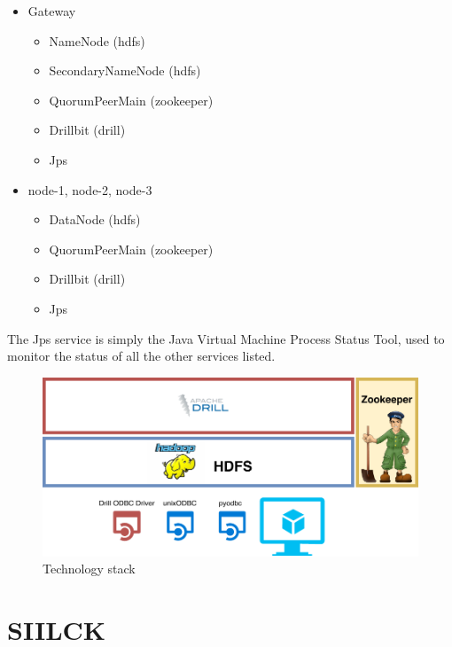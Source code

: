 \documentclass[a4paper,english]{report}
\begin{document}
			\begin{itemize}
				\item Gateway
				\begin{itemize}
					\item NameNode (hdfs)
					\item SecondaryNameNode (hdfs)
					\item QuorumPeerMain (zookeeper)
					\item Drillbit (drill)
					\item Jps
				\end{itemize}
				\item node-1, node-2, node-3
				\begin{itemize}
					\item DataNode (hdfs)
					\item QuorumPeerMain (zookeeper)
					\item Drillbit (drill)
					\item Jps
				\end{itemize}
			\end{itemize}
			The Jps service is simply the Java Virtual Machine Process Status Tool, used to monitor the status of all the other services listed.
			\begin{figure}[H]
				\includegraphics[width=\textwidth]{tech_stack}
				\caption{Technology stack}
			\end{figure}
		\clearpage
		\section{SIILCK}
		\label{sec:siilck}
\end{document}
